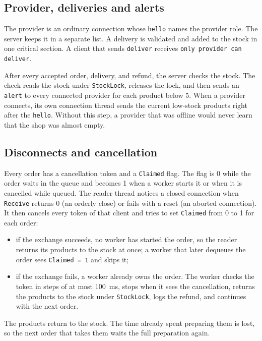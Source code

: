 \documentclass[12pt,a4paper]{article}
\begin{document}
\subsection{Provider, deliveries and alerts}

The provider is an ordinary connection whose \texttt{hello} names the provider
role. The server keeps it in a separate list. A delivery is validated and added to
the stock in one critical section. A client that sends \texttt{deliver} receives
\texttt{only provider can deliver}.

After every accepted order, delivery, and refund, the server checks the stock. The
check reads the stock under \texttt{StockLock}, releases the lock, and then sends
an \texttt{alert} to every connected provider for each product below 5. When a
provider connects, its own connection thread sends the current low-stock products
right after the \texttt{hello}. Without this step, a provider that was offline would
never learn that the shop was almost empty.

\subsection{Disconnects and cancellation}

Every order has a cancellation token and a \texttt{Claimed} flag. The flag is 0
while the order waits in the queue and becomes 1 when a worker starts it or when
it is cancelled while queued. The reader thread notices a closed connection when
\texttt{Receive} returns 0 (an orderly close) or fails with a reset (an aborted
connection). It then cancels every token of that client and tries to set
\texttt{Claimed} from 0 to 1 for each order:

\begin{itemize}[itemsep=2pt]
    \item if the exchange succeeds, no worker has started the order, so the reader
          returns its products to the stock at once; a worker that later dequeues
          the order sees \texttt{Claimed = 1} and skips it;
    \item if the exchange fails, a worker already owns the order. The worker checks
          the token in steps of at most 100~ms, stops when it sees the cancellation,
          returns the products to the stock under \texttt{StockLock}, logs the refund,
          and continues with the next order.
\end{itemize}

The products return to the stock. The time already spent preparing them is lost,
so the next order that takes them waits the full preparation again.
\end{document}
